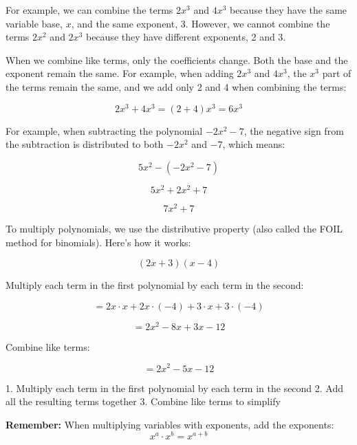 \documentclass{article} %
\begin{document}
For example, we can combine the terms $2x^3$ and $ 4x^3 $ because they have the same variable base, $x$, and the same exponent, 3. However, we cannot combine the terms $2x^2$ and $2x^3$ because they have different exponents, 2 and 3.

\noindent When we combine like terms, only the coefficients change. Both the base and the exponent remain the same. For example, when adding $ 2x^3 $ and $ 4x^3 $, the $x^3 $ part of the terms remain the same, and we add only 2 and 4 when combining the terms:

\[
2x^3 + 4x^3 = (2 + 4)x^3 = 6x^3
\]

\noindent For example, when subtracting the polynomial \(-2x^2 - 7\), the negative sign from the subtraction is distributed to both \(-2x^2\) and \(-7\), which means:

\[
5x^2 - (-2x^2 - 7)
\]

\[
5x^2 + 2x^2 + 7
\]

\[
7x^2 + 7
\]

\noindent To multiply polynomials, we use the distributive property (also called the FOIL method for binomials). Here's how it works:

\[
(2x + 3)(x - 4)
\]

Multiply each term in the first polynomial by each term in the second:

\[
= 2x \cdot x + 2x \cdot (-4) + 3 \cdot x + 3 \cdot (-4)
\]

\[
= 2x^2 - 8x + 3x - 12
\]

Combine like terms:

\[
= 2x^2 - 5x - 12
\]

1. Multiply each term in the first polynomial by each term in the second
2. Add all the resulting terms together
3. Combine like terms to simplify

\textbf{Remember:} When multiplying variables with exponents, add the exponents:
\[
x^a \cdot x^b = x^{a+b}
\]
\end{document}
